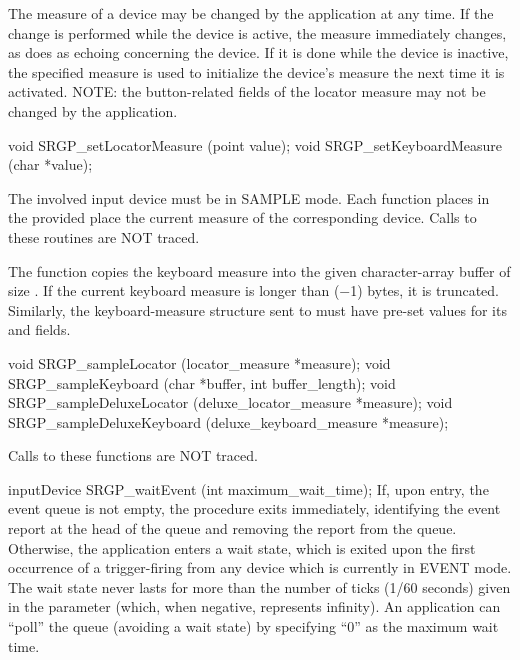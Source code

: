 The measure of a device may be changed by the application at any time.
If the change is performed while the device is active, the measure
immediately changes, as does as echoing concerning the device.
If it is done while the device is inactive, the specified measure is
used to initialize the device's measure the next time it is activated.
NOTE: the button-related fields of the locator measure may not be 
changed by the application.

\newsynopsis
void SRGP_setLocatorMeasure (point value);
void SRGP_setKeyboardMeasure (char *value);
\endsynopsis




The involved input device must be in SAMPLE mode.  Each function places in the
provided place the current measure of the corresponding device.   Calls to
these routines are NOT traced. 

\newpar
The
 function copies the keyboard measure into the
given character-array buffer of size .  If the current
keyboard measure is longer than ($-$1) bytes, it is
truncated.  Similarly, the keyboard-measure structure sent to
 must 
have pre-set values for its 
and  fields.

\newsynopsis
void SRGP_sampleLocator (locator_measure *measure);
void SRGP_sampleKeyboard (char *buffer, int buffer_length);
void SRGP_sampleDeluxeLocator (deluxe_locator_measure *measure);
void SRGP_sampleDeluxeKeyboard (deluxe_keyboard_measure *measure);
\endsynopsis



Calls to these functions are NOT traced.

\newsynopsis
inputDevice SRGP_waitEvent (int maximum_wait_time);
\endsynopsis
If, upon entry, the event queue is not empty, the procedure exits immediately,
identifying the event report at the head of the queue and removing the report
from the queue.  Otherwise, the application enters a wait state, which is
exited upon the first occurrence of a trigger-firing from any device which is
currently in EVENT mode.  The wait state never lasts for more than the number
of ticks (1/60 seconds) given in the
 parameter (which,
when negative, represents infinity).  An application can ``poll'' the queue
(avoiding a wait state) by specifying ``0'' as the maximum wait time.


